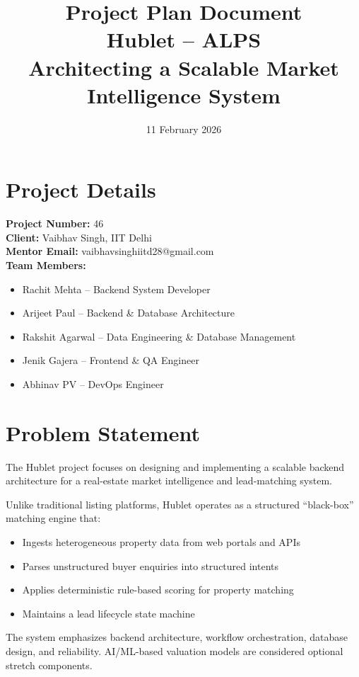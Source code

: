 \documentclass[12pt,a4paper]{article}
\title{\textbf{Project Plan Document}\\
\vspace{0.3cm}
Hublet – ALPS\\
\vspace{0.2cm}
\large Architecting a Scalable Market Intelligence System}
\date{11 February 2026}
\begin{document}
\maketitle

\section*{Project Details}

\textbf{Project Number:} 46 \\[4pt]
\textbf{Client:} Vaibhav Singh, IIT Delhi \\[4pt]
\textbf{Mentor Email:} vaibhavsinghiitd28@gmail.com \\[6pt]

\textbf{Team Members:}
\begin{itemize}[noitemsep]
    \item Rachit Mehta – Backend System Developer
    \item Arijeet Paul – Backend \& Database Architecture
    \item Rakshit Agarwal – Data Engineering \& Database Management
    \item Jenik Gajera – Frontend \& QA Engineer
    \item Abhinav PV – DevOps Engineer
\end{itemize}

\section*{Problem Statement}

The Hublet project focuses on designing and implementing a scalable backend architecture for a real-estate market intelligence and lead-matching system.

Unlike traditional listing platforms, Hublet operates as a structured “black-box” matching engine that:

\begin{itemize}
    \item Ingests heterogeneous property data from web portals and APIs
    \item Parses unstructured buyer enquiries into structured intents
    \item Applies deterministic rule-based scoring for property matching
    \item Maintains a lead lifecycle state machine
\end{itemize}

The system emphasizes backend architecture, workflow orchestration, database design, and reliability. AI/ML-based valuation models are considered optional stretch components.
\end{document}
